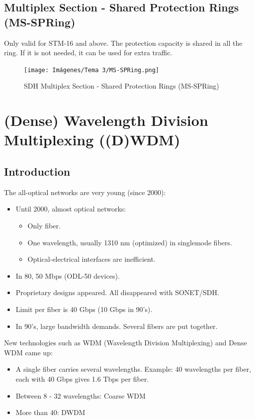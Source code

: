 \documentclass[
	12pt,
	twoside
]{book}
\begin{document}
\subsection{Multiplex Section - Shared Protection Rings (MS-SPRing)}

Only valid for STM-16 and above. The protection capacity is shared in all the ring. If it is not needed, it can be used for extra traffic.

\begin{figure}[H]
	\centering
	\texttt{[image: Imágenes/Tema 3/MS-SPRing.png]}
	\caption{
		\label{fig:unit3_MS_SPRing}
		SDH Multiplex Section - Shared Protection Rings (MS-SPRing)
	}
\end{figure}

\section{(Dense) Wavelength Division Multiplexing ((D)WDM)}

\subsection{Introduction}

The all-optical networks are very young (since 2000):

\begin{itemize}
	\item {
		Until 2000, almost optical networks:
		\begin{itemize}
			\item Only fiber.
			\item One wavelength, usually 1310 nm (optimized) in singlemode fibers.
			\item Optical-electrical interfaces are inefficient.
		\end{itemize}
	}
	\item In 80, 50 Mbps (ODL-50 devices).
	\item Proprietary designs appeared. All disappeared with SONET/SDH.
	\item Limit per fiber is 40 Gbps (10 Gbps in 90’s).
	\item In 90’s, large bandwidth demands. Several fibers are put together.
\end{itemize}

New technologies such as WDM (Wavelength Division Multiplexing) and Dense WDM came up:

\begin{itemize}
	\item A single fiber carries several wavelengths. Example: 40 wavelengths per fiber, each with 40 Gbps gives 1.6 Tbps per fiber.
	\item Between 8 - 32 wavelengths: Coarse WDM
	\item More than 40: DWDM
\end{itemize}
\end{document}
